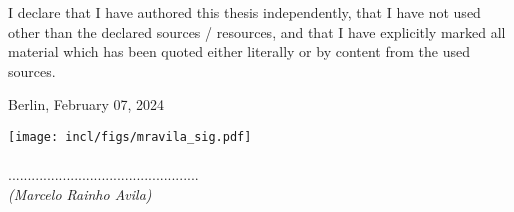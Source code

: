 \newpage
\thispagestyle{empty}

\begin{large}

\vspace*{2cm}

\noindent
I declare that I have authored this thesis independently, that I have not used other than the declared sources / resources, and that I have explicitly marked all material which has been quoted either literally or by content from the used sources.

\vspace{2cm}

\noindent
Berlin, February 07, 2024
\vspace{1cm}

\hspace*{.5cm}%
\texttt{[image: incl/figs/mravila\_sig.pdf]}\\
\vspace*{-2.2em}\\
.................................................\\
\hspace*{.5cm}
\textit{(Marcelo Rainho Avila)}

\end{large}